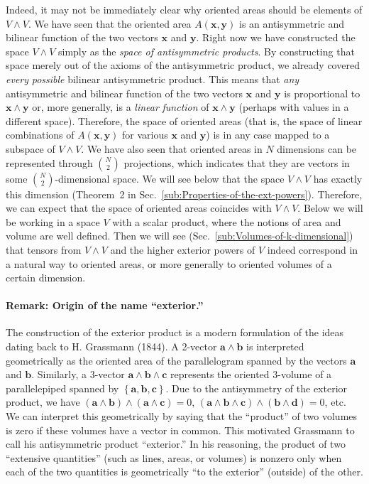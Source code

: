 Indeed, it may not be immediately clear why oriented areas should
be elements of $V\wedge V$. We have seen that the oriented area $A(\mathbf{x},\mathbf{y})$
is an antisymmetric and bilinear function of the two vectors $\mathbf{x}$
and $\mathbf{y}$. Right now we have constructed the space $V\wedge V$
simply as the \emph{space of antisymmetric products}. By constructing
that space merely out of the axioms of the antisymmetric product,
we already covered \emph{every} \emph{possible} bilinear antisymmetric
product. This means that \emph{any} antisymmetric and bilinear function
of the two vectors $\mathbf{x}$ and $\mathbf{y}$ is proportional
to $\mathbf{x}\wedge\mathbf{y}$ or, more generally, is a \emph{linear}
\emph{function} of $\mathbf{x}\wedge\mathbf{y}$ (perhaps with values
in a different space). Therefore, the space of oriented areas (that
is, the space of linear combinations of $A(\mathbf{x},\mathbf{y})$
for various $\mathbf{x}$ and $\mathbf{y}$) is in any case mapped
to a subspace of $V\wedge V$. We have also seen that oriented areas
in $N$ dimensions can be represented through ${N \choose 2}$ projections,
which indicates that they are vectors in some ${N \choose 2}$-dimen\-sion\-al
space. We will see below that the space $V\wedge V$ has exactly this
dimension (Theorem~2 in Sec.~\ref{sub:Properties-of-the-ext-powers}).
Therefore, we can expect that the space of oriented areas coincides
with $V\wedge V$. Below we will be working in a space $V$ with a
scalar product, where the notions of area and volume are well defined.
Then we will see (Sec.~\ref{sub:Volumes-of-k-dimensional}) that
tensors from $V\wedge V$ and the higher exterior powers of $V$ indeed
correspond in a natural way to oriented areas, or more generally to
oriented volumes of a certain dimension.


\paragraph{Remark: Origin of the name {}``exterior.''}

The construction of the exterior product
is a modern formulation of the ideas dating back to H. Grassmann (1844).
A 2-vector $\mathbf{a}\wedge\mathbf{b}$ is interpreted geometrically
as the oriented area of the parallelogram spanned by the vectors $\mathbf{a}$
and $\mathbf{b}$. Similarly, a 3-vector $\mathbf{a}\wedge\mathbf{b}\wedge\mathbf{c}$
represents the oriented 3-volume of a parallelepiped spanned by $\left\{ \mathbf{a},\mathbf{b},\mathbf{c}\right\} $.
Due to the antisymmetry of the exterior product, we have $(\mathbf{a}\wedge\mathbf{b})\wedge(\mathbf{a}\wedge\mathbf{c})=0$,
$(\mathbf{a}\wedge\mathbf{b}\wedge\mathbf{c})\wedge(\mathbf{b}\wedge\mathbf{d})=0$,
etc. We can interpret this geometrically by saying that the {}``product''
of two volumes is zero if these volumes have a vector in common. This
motivated Grassmann to call his antisymmetric product {}``exterior.''
In his reasoning, the product of two {}``extensive quantities''
(such as lines, areas, or volumes) is nonzero only when each of the
two quantities is geometrically {}``to the exterior'' (outside)
of the other.



